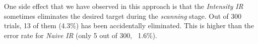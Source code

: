 One side effect that we have observed in this approach is that the {\em Intensity IR} sometimes eliminates the desired target during the {\em scanning} stage. Out of 300 trials, 13 of them (4.3\%) has been accidentally eliminated. This is higher than the error rate for {\em Naive IR} (only 5 out of 300, ~1.6\%). %

